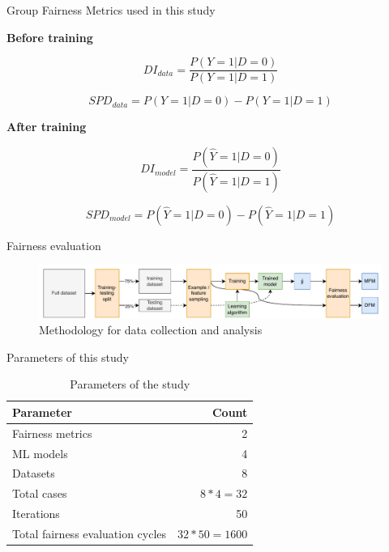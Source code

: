 \documentclass[aspectratio=169]{beamer}
\begin{document}
\begin{frame}[t]{Group Fairness Metrics used in this study}
  \begin{center}
    \textbf{Before training}
  \end{center}
  \begin{equation}
    DI_{data} = \frac{P(Y=1|D=0)}{P(Y=1|D=1)}
    \label{eq:di-data}
  \end{equation}

  \begin{equation}
    SPD_{data} = P(Y=1|D=0)-P(Y=1|D=1)
    \label{eq:spd-data}
  \end{equation}

  \vfill

  \begin{center}
    \textbf{After training}
  \end{center}
  \begin{equation}
    DI_{model} = \frac{P(\hat{Y}=1|D=0)}{P(\hat{Y}=1|D=1)}
    \label{eq:di-model}
  \end{equation}

  \begin{equation}
    SPD_{model} = P(\hat{Y}=1|D=0)-P(\hat{Y}=1|D=1)
    \label{eq:spd-model}
  \end{equation}
\end{frame}

\begin{frame}{Fairness evaluation}
  \begin{figure}[c]
    \centering
    \includegraphics[width=0.95\linewidth]{method.pdf}
    \caption{Methodology for data collection and analysis}
    \label{fig:method}
  \end{figure}
\end{frame}

\begin{frame}{Parameters of this study}
  \begin{table}
    \centering
    \begin{tabular}{lr}
      \toprule
      \textbf{Parameter} & \textbf{Count}\\
      \midrule
      Fairness metrics & 2\\
      ML models & 4\\
      Datasets & 8\\
      Total cases & $8*4=32$\\
      Iterations & 50\\
      Total fairness evaluation cycles & $32*50=1600$\\
      \bottomrule
    \end{tabular}
    \label{tab:parameters}
    \caption{Parameters of the study}
  \end{table}
\end{frame}
\end{document}
